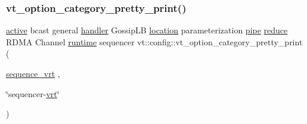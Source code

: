 \subsubsection{\texorpdfstring{vt\+\_\+option\+\_\+category\+\_\+pretty\+\_\+print()}{vt\_option\_category\_pretty\_print()}\hspace{0.1cm}{\footnotesize\ttfamily [13/16]}}
{\footnotesize\ttfamily \hyperlink{namespacevt_1_1config_a6bd1d6215bda0d8ca02811798399f689a82f77c67af0c363709010c6df4dbd920}{active} bcast general \hyperlink{namespacevt_1_1config_a6bd1d6215bda0d8ca02811798399f689a82a0081a94d5c5dfd18b0b3f7eca64b7}{handler} Gossip\+LB \hyperlink{namespacevt_1_1config_a6bd1d6215bda0d8ca02811798399f689aa8d8501591ca3859c828489054b17640}{location} parameterization \hyperlink{namespacevt_1_1config_a6bd1d6215bda0d8ca02811798399f689ad2f6c4149417910966357969e4740fbd}{pipe} \hyperlink{namespacevt_1_1config_a6bd1d6215bda0d8ca02811798399f689af558c370706b5e7bd8ba5224657ca9b4}{reduce} R\+D\+MA Channel \hyperlink{namespacevt_1_1config_a6bd1d6215bda0d8ca02811798399f689afdcadb44dd13617f18aba8d42a257967}{runtime} sequencer vt\+::config\+::vt\+\_\+option\+\_\+category\+\_\+pretty\+\_\+print (\begin{DoxyParamCaption}\item[{\hyperlink{namespacevt_1_1config_a6bd1d6215bda0d8ca02811798399f689a5c4a4681463b7a071f9a19bac0d3ef56}{sequence\+\_\+vrt}}]{,  }\item[{\char`\"{}sequencer-\/\hyperlink{namespacevt_1_1config_a6bd1d6215bda0d8ca02811798399f689a012d139c89a14e56a85f32fd82e7c7d3}{vrt}\char`\"{}}]{ }\end{DoxyParamCaption})}

\mbox{\label{namespacevt_1_1config_a5ff2272b86424e6536a42186e3e3375b}} 
